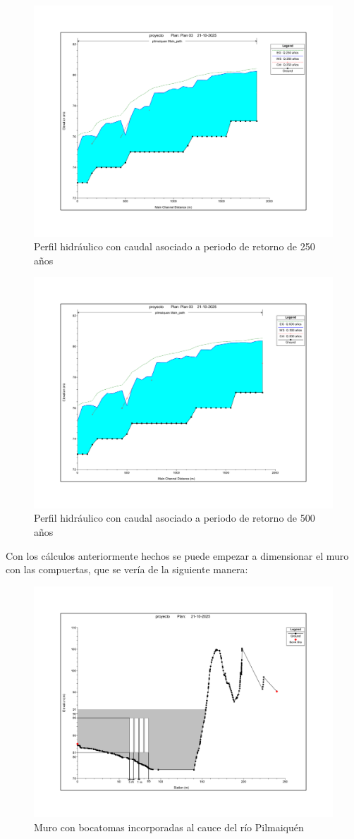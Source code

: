 \documentclass{article} %
\begin{document}
\begin{figure}[H]
    \centering
    \includegraphics[width=0.6\linewidth]{imagenes/perfil_250_sb.pdf}
    \caption{Perfil hidráulico con caudal asociado a periodo de retorno de 250 años}
\end{figure}

\begin{figure}[H]
    \centering
    \includegraphics[width=0.6\linewidth]{imagenes/perfil_500_sb.pdf}
    \caption{Perfil hidráulico con caudal asociado a periodo de retorno de 500 años}
\end{figure}

Con los cálculos anteriormente hechos se puede empezar a dimensionar el muro con las compuertas, que se vería de la siguiente manera:

\begin{figure}[H]
    \centering
    \includegraphics[width=0.8\linewidth]{imagenes/muro.pdf}
    \caption{Muro con bocatomas incorporadas al cauce del río Pilmaiquén}
\end{figure}
\end{document}
